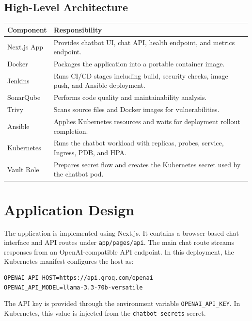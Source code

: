 \documentclass[12pt,a4paper]{article}
\begin{document}
\subsection{High-Level Architecture}

\begin{center}
\begin{tabular}{>{\raggedright\arraybackslash}p{4cm} >{\raggedright\arraybackslash}p{9cm}}
\toprule
\textbf{Component} & \textbf{Responsibility} \\
\midrule
Next.js App & Provides chatbot UI, chat API, health endpoint, and metrics endpoint. \\
Docker & Packages the application into a portable container image. \\
Jenkins & Runs CI/CD stages including build, security checks, image push, and Ansible deployment. \\
SonarQube & Performs code quality and maintainability analysis. \\
Trivy & Scans source files and Docker images for vulnerabilities. \\
Ansible & Applies Kubernetes resources and waits for deployment rollout completion. \\
Kubernetes & Runs the chatbot workload with replicas, probes, service, Ingress, PDB, and HPA. \\
Vault Role & Prepares secret flow and creates the Kubernetes secret used by the chatbot pod. \\
\bottomrule
\end{tabular}
\end{center}

\section{Application Design}

The application is implemented using Next.js. It contains a browser-based chat
interface and API routes under \texttt{app/pages/api}. The main chat route
streams responses from an OpenAI-compatible API endpoint. In this deployment,
the Kubernetes manifest configures the host as:

\begin{lstlisting}[style=projectcode]
OPENAI_API_HOST=https://api.groq.com/openai
OPENAI_API_MODEL=llama-3.3-70b-versatile
\end{lstlisting}

The API key is provided through the environment variable
\texttt{OPENAI\_API\_KEY}. In Kubernetes, this value is injected from the
\texttt{chatbot-secrets} secret.
\end{document}
